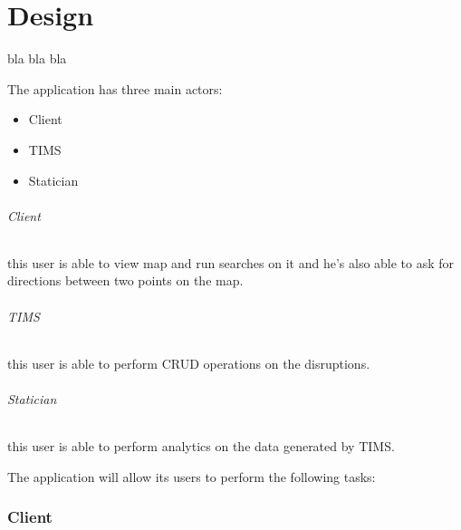 
\part{Design}


bla bla bla


The application has three main actors:
\begin{itemize}
	\item Client
	\item TIMS
	\item Statician
\end{itemize}

\paragraph{Client}
this user is able to view map and run searches on it and he’s also able to ask 
for directions between two points on the map.

\paragraph{TIMS}
this user is able to perform CRUD operations on the disruptions.

\paragraph{Statician}
this user is able to perform analytics on the data generated by TIMS.



The application will allow its users to perform the following tasks:

\section{Client}

